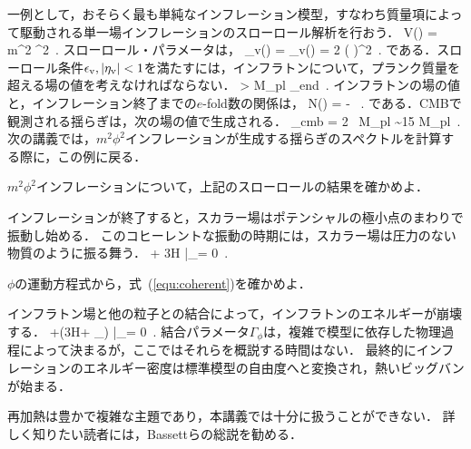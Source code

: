 
一例として，おそらく最も単純なインフレーション模型，すなわち質量項によって駆動される単一場インフレーションのスローロール解析を行おう．
\beq
V(\phi) =  m^2 \phi^2\, .
\eeq
スローロール・パラメータは，
\beq
\epsilon_{\rm v}(\phi) = \eta_{\rm v}(\phi) = 2 \left( \right)^2\, .
\eeq
である．スローロール条件$\epsilon_{\rm v}, |\eta_{\rm v}| < 1$を満たすには，インフラトンについて，プランク質量を超える場の値を考えなければならない．
\beq
\phi >  M_{\rm pl} \equiv \phi_{\rm end}\, .
\eeq
インフラトンの場の値と，インフレーション終了までの$e$-fold数の関係は，
\beq
N(\phi) =  - \, .
\eeq
である．CMBで観測される揺らぎは，次の場の値で生成される．
\beq
\phi_{\rm cmb} = 2  \, M_{\rm pl} \sim 15 M_{\rm pl}\, .
\eeq
次の講義では，$m^2 \phi^2$インフレーションが生成する揺らぎのスペクトルを計算する際に，この例に戻る．

\begin{thm}
$m^2 \phi^2$インフレーションについて，上記のスローロールの結果を確かめよ．
\label{ex:chaotic}
\end{thm}


インフレーションが終了すると，スカラー場はポテンシャルの極小点のまわりで振動し始める．
このコヒーレントな振動の時期には，スカラー場は圧力のない物質のように振る舞う．
\beq
\label{equ:coherent}
 + 3H \bar \rho_\phi = 0\, .
\eeq

\begin{thm}[スカラー場のコヒーレントな振動]
$\phi$の運動方程式から，式~(\ref{equ:coherent})を確かめよ．
\label{ex:coherent}
\end{thm}

インフラトン場と他の粒子との結合によって，インフラトンのエネルギーが崩壊する．
\beq
{} +(3H+ \Gamma_\phi) \bar \rho_\phi = 0\, .
\eeq
結合パラメータ$\Gamma_\phi$は，複雑で模型に依存した物理過程によって決まるが，ここではそれらを概説する時間はない．
最終的にインフレーションのエネルギー密度は標準模型の自由度へと変換され，熱いビッグバンが始まる．

再加熱は豊かで複雑な主題であり，本講義では十分に扱うことができない．
詳しく知りたい読者には，Bassettらの総説\cite{BassettReview}を勧める．




